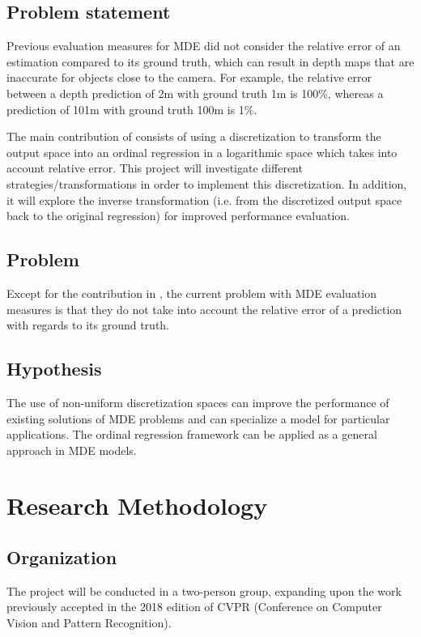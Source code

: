\documentclass[12pt,twoside]{article}
\begin{document}
\subsection{Problem statement}
Previous evaluation measures for MDE did not consider the relative error of an estimation compared to its ground truth, which can result in depth maps that are inaccurate for objects close to the camera. For example, the relative error between a depth prediction of 2m with ground truth 1m is 100\%, whereas a prediction of 101m with ground truth 100m is 1\%.

The main contribution of \cite{huan_fu_deep_2018} consists of using a discretization to transform the output space into an ordinal regression in a logarithmic space which takes into account relative error. This project will investigate different strategies/transformations in order to implement this discretization. In addition, it will explore the inverse transformation (i.e. from the discretized output space back to the original regression) for improved performance evaluation.

\subsection{Problem}
Except for the contribution in \cite{huan_fu_deep_2018}, the current problem with MDE evaluation measures is that they do not take into account the relative error of a prediction with regards to its ground truth.

\subsection{Hypothesis}
The use of non-uniform discretization spaces can improve the performance of existing solutions of MDE problems and can specialize a model for particular applications.
The ordinal regression framework can be applied as a general approach in MDE models.

\section{Research Methodology}
\label{sec:method}

\subsection{Organization}
The project will be conducted in a two-person group, expanding upon the work previously accepted in the 2018 edition of CVPR (Conference on Computer Vision and Pattern Recognition).
\end{document}
